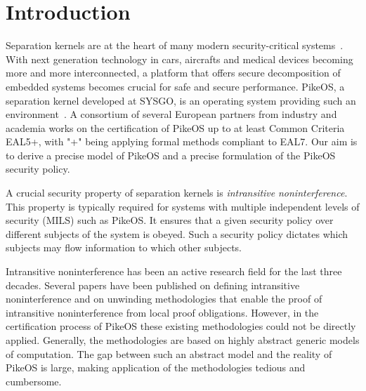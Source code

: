 \documentclass[11pt,a4paper]{article}
\begin{document}
\euromilsmaketitlelists
\clearpage

\section{Introduction}
Separation kernels are at the heart of many modern security-critical systems~\cite{rushby81}.
With next generation technology in cars, aircrafts and medical devices becoming 
more and more interconnected, a platform that offers secure decomposition of 
embedded systems becomes crucial for safe and secure performance.
PikeOS, a separation kernel developed at SYSGO, is an operating system providing 
such an environment~\cite{kaiser07,brygier09}.
A consortium of several European partners from industry and academia works on 
the certification of PikeOS up to at least Common Criteria EAL5+, with "+" 
being applying formal methods compliant to EAL7.
Our aim is to derive a precise model of PikeOS and a precise formulation of the 
PikeOS security policy.%

A crucial security property of separation kernels is \emph{intransitive} \emph{noninterference}.
This property is typically required for systems with multiple independent levels 
of security (MILS) such as PikeOS. It ensures that a given security policy over 
different subjects of the system is obeyed. Such a security policy dictates 
which subjects may flow information to which other subjects.


Intransitive noninterference has been an active research field for the last 
three decades. Several papers have been published on defining intransitive 
noninterference and on unwinding methodologies that enable the proof of 
intransitive noninterference from local proof obligations. However, in the 
certification process of PikeOS these existing methodologies could not be directly 
applied. Generally, the methodologies are based on highly abstract generic 
models of computation. The gap between such an abstract model and the reality of 
PikeOS is large, making application of the methodologies tedious and cumbersome.
\end{document}

